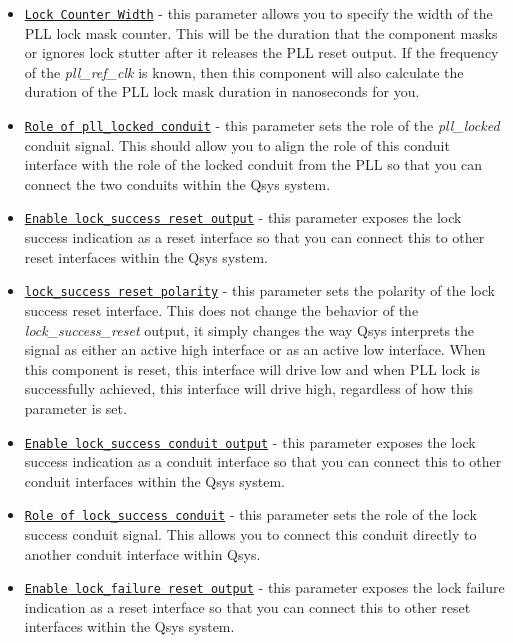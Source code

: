 \documentclass{article}
\begin{document}
\begin{flushleft}
\begin{itemize}
\item \texttt{\underline{Lock Counter Width}} - this parameter allows you to specify the width of the PLL lock mask counter.  This will be the duration that the component masks or ignores lock stutter after it releases the PLL reset output.  If the frequency of the \emph{pll\_ref\_clk} is known, then this component will also calculate the duration of the PLL lock mask duration in nanoseconds for you.

\item \texttt{\underline{Role of pll\_locked conduit}} - this parameter sets the role of the \emph{pll\_locked} conduit signal.  This should allow you to align the role of this conduit interface with the role of the locked conduit from the PLL so that you can connect the two conduits within the Qsys system.

\item \texttt{\underline{Enable lock\_success reset output}} - this parameter exposes the lock success indication as a reset interface so that you can connect this to other reset interfaces within the Qsys system.

\item \texttt{\underline{lock\_success reset polarity}} - this parameter sets the polarity of the lock success reset interface.  This does not change the behavior of the \emph{lock\_success\_reset} output, it simply changes the way Qsys interprets the signal as either an active high  interface or as an active low  interface.  When this component is reset, this interface will drive low and when PLL lock is successfully achieved, this interface will drive high, regardless of how this parameter is set.

\item \texttt{\underline{Enable lock\_success conduit output}} - this parameter exposes the lock success indication as a conduit interface so that you can connect this to other conduit interfaces within the Qsys system.

\item \texttt{\underline{Role of lock\_success conduit}} - this parameter sets the role of the lock success conduit signal.  This allows you to connect this conduit directly to another conduit interface within Qsys.

\item \texttt{\underline{Enable lock\_failure reset output}} - this parameter exposes the lock failure indication as a reset interface so that you can connect this to other reset interfaces within the Qsys system.


\end{itemize}
\end{flushleft}
\end{document}
